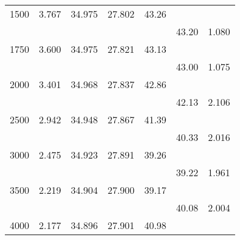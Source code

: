 \begin{table}[t!]
\begin{tabular*}{108mm}{@{}rrrrrrl}
1500&   3.767&  34.975& 27.802& 43.26&\\
 &            &       &       &       &     43.20&  1.080\\
1750&   3.600&  34.975& 27.821& 43.13&\\
 &            &       &       &       &     43.00&  1.075\\
2000&   3.401&  34.968& 27.837& 42.86&\\
 &            &       &       &       &     42.13&  2.106\\
2500&   2.942&  34.948& 27.867& 41.39&\\
 &            &       &       &       &     40.33&  2.016\\
3000&   2.475&  34.923& 27.891& 39.26&\\
 &            &       &       &       &     39.22&  1.961\\
3500&   2.219&  34.904& 27.900& 39.17&\\
 &            &       &       &       &     40.08&  2.004\\
4000&   2.177&  34.896& 27.901& 40.98\rule[-1ex]{0mm}{1ex}  \\
\hline
\end{tabular*} \\[0.5ex]
\vspace{-3ex}
\end{table}
